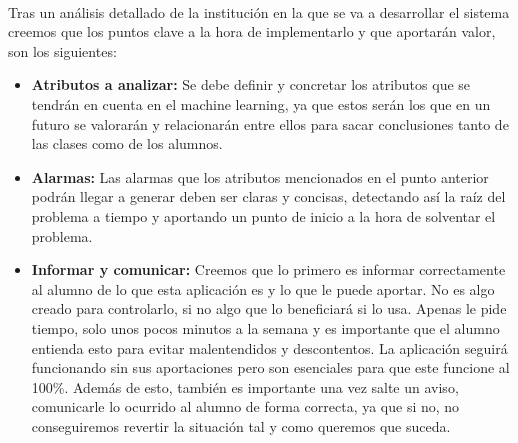 \paragraph{}
Tras un análisis detallado de la institución en la que se va a desarrollar el sistema creemos que los puntos clave a la hora de implementarlo y que aportarán valor, son los siguientes:  
 
\begin{itemize}
\item \textbf{Atributos a analizar:} Se debe definir y concretar los atributos que se tendrán en cuenta en el machine learning, ya que estos serán los que en un futuro se valorarán y relacionarán entre ellos para sacar conclusiones tanto de las clases como de los alumnos.

\item \textbf{Alarmas:} Las alarmas que los atributos mencionados en el punto anterior podrán llegar a generar deben ser claras y concisas, detectando así la raíz del problema a tiempo y aportando un punto de inicio a la hora de solventar el problema.

\item \textbf{Informar y comunicar:} Creemos que lo primero es informar correctamente al alumno de lo que esta aplicación es y lo que le puede aportar. No es algo creado para controlarlo, si no algo que lo beneficiará si lo usa. Apenas le pide tiempo, solo unos pocos minutos a la semana y es importante que el alumno entienda esto para evitar malentendidos y descontentos. La aplicación seguirá funcionando sin sus aportaciones pero son esenciales para que este funcione al 100\%. Además de esto, también es importante una vez salte un aviso, comunicarle lo ocurrido al alumno de forma correcta, ya que si no, no conseguiremos revertir la situación tal y como queremos que suceda.

\nocite{marcoPedagogico}\nocite{hezkuntzaEreduArdatzak}\nocite{metodologiaParticipativa}\nocite{aprendizajeBasadoEnProblemas}\nocite{profesorUniversitario}\nocite{modeloUniversitario}
  
\end{itemize}
